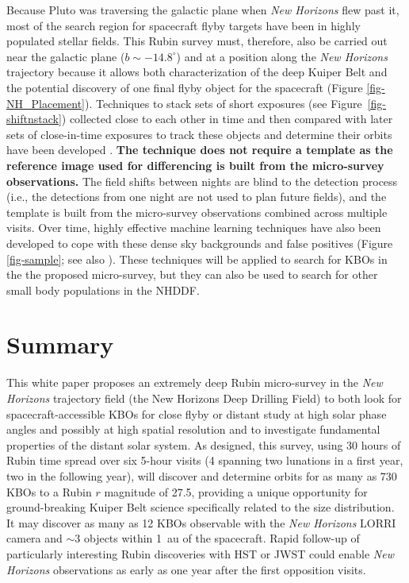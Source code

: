 \documentclass[modern,preprint]{aastex7}
\begin{document}
Because Pluto was traversing the galactic plane when {\it New Horizons} flew past it, most of the search region for spacecraft flyby targets have been in highly populated stellar fields. This Rubin survey must, therefore, also be carried out near the galactic plane ($b \sim -14.8^\circ$) and at a position along the {\it New Horizons} trajectory because it allows both characterization of the deep Kuiper Belt and the potential discovery of one final flyby object for the spacecraft (Figure \ref{fig-NH_Placement}). 
Techniques to stack sets of short exposures (see Figure~\ref{fig-shiftnstack}) collected close to each other in time and then compared with later sets of close-in-time exposures to track these objects and determine their orbits have been developed \citep{Fraser2024LPI, Yoshida2024}.
\textbf{The technique does not require a template as the reference image used for differencing is built from the micro-survey observations.} The field shifts between nights are blind to the detection process (i.e., the detections from one night are not used to plan future fields), and the template is built from the micro-survey observations combined across multiple visits. 
Over time, highly effective machine learning techniques have also been developed to cope with these dense sky backgrounds and false positives (Figure \ref{fig-sample}; see also \citet{Napier2023,Buie2024,Fraser2024PSJ}). 
These techniques will be applied to search for KBOs in the the proposed micro-survey, but they can also be used to search for other small body populations in the NHDDF. 


\section{Summary}
This white paper proposes an extremely deep Rubin micro-survey in the {\it New Horizons} trajectory field (the New Horizons Deep Drilling Field) to both look for spacecraft-accessible KBOs for close flyby or distant study at high solar phase angles and possibly at high spatial resolution and to investigate fundamental properties of the distant solar system. As designed, this survey, using 30 hours of Rubin time spread over six 5-hour visits (4 spanning two lunations in a first year, two in the following year), will discover and determine orbits for as many as 730 KBOs to a Rubin $r$ magnitude of 27.5, providing a unique opportunity for ground-breaking Kuiper Belt science specifically related to the size distribution. It may discover as many as 12 KBOs observable with the {\it New Horizons} LORRI camera and $\sim$3 objects within 1~au of the spacecraft. Rapid follow-up of particularly interesting Rubin discoveries with HST or JWST could enable {\it New Horizons} observations as early as one year after the first opposition visits. 
\end{document}

